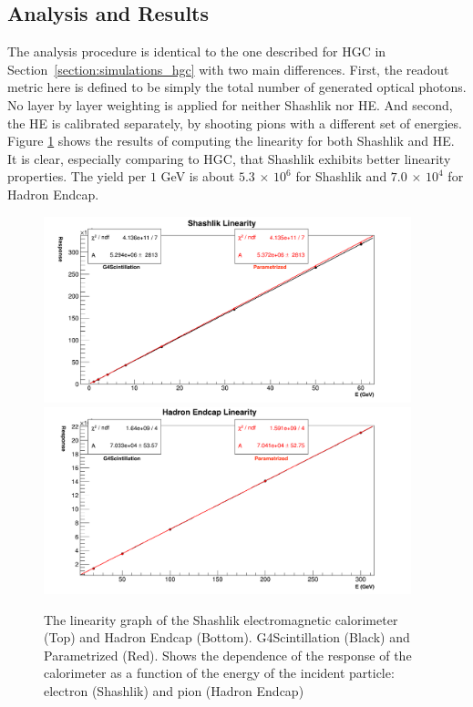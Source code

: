 \subsection{Analysis and Results}
The analysis procedure is identical to the one described for HGC in Section~\ref{section:simulations_hgc} with two main differences. First, the readout metric here is defined to be simply the total number of generated optical photons. No layer by layer weighting is applied for neither Shashlik nor HE. And second, the HE is calibrated separately, by shooting pions with a different set of energies. Figure \ref{fig:simulations_shashlik_linearity} shows the results of computing the linearity for both Shashlik and HE. It is clear, especially comparing to {\sc HGC}, that Shashlik exhibits better linearity properties. The yield per $1$ GeV is about $5.3$ $\times$ $10^6$ for Shashlik and $7.0$ $\times$ $10^4$ for Hadron Endcap.
 \begin{figure}[htbp]
    \centering
    \includegraphics[width=0.95\textwidth]{figures/ch_simulations/shashlik/performance/ResponseVsEnergy.png}\\
    \includegraphics[width=0.95\textwidth]{figures/ch_simulations/he/performance/Linearity.png}
    \caption{The linearity graph of the Shashlik electromagnetic calorimeter (Top) and Hadron Endcap (Bottom). G4Scintillation (Black) and Parametrized (Red). Shows the dependence of the response of the calorimeter as a function of the energy of the incident particle: electron (Shashlik) and pion (Hadron Endcap)}
    \label{fig:simulations_shashlik_linearity}
 \end{figure}

